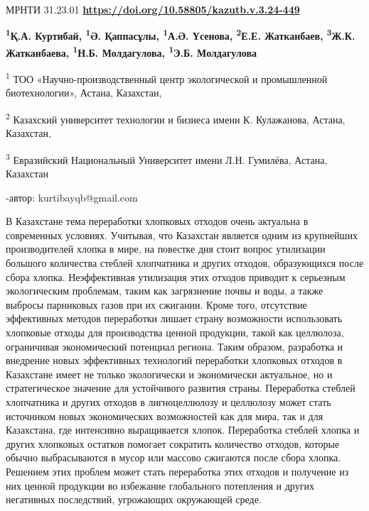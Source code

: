 \newpage
МРНТИ 31.23.01
\hfill {\bfseries \href{https://doi.org/10.58805/kazutb.v.3.24-449}{https://doi.org/10.58805/kazutb.v.3.24-449}}


\begin{center}
{\bfseries \textsuperscript{1}Қ.А. Куртибай\envelope, \textsuperscript{1}Ә. Қаппасұлы, \textsuperscript{1}А.Ә. Үсенова, \textsuperscript{2}Е.Е. Жатканбаев, \textsuperscript{3}Ж.К. Жатканбаева, \textsuperscript{1}Н.Б. Молдагулова, \textsuperscript{1}Э.Б. Молдагулова}

\textsuperscript{1} ТОО «Научно-производственный центр экологической и
промышленной биотехнологии», Астана, Казахстан,

\textsuperscript{2} Казахский университет технологии и бизнеса имени К.
Кулажанова, Астана, Казахстан,

\textsuperscript{3} Евразийский Национальный Университет имени Л.Н.
Гумилёва, Астана, Казахстан

-автор: kurtibayqb@gmail.com
\end{center}

В Казахстане тема переработки хлопковых отходов очень актуальна в
современных условиях. Учитывая, что Казахстан является одним из
крупнейших производителей хлопка в мире, на повестке дня стоит вопрос
утилизации большого количества стеблей хлопчатника и других отходов,
образующихся после сбора хлопка. Неэффективная утилизация этих отходов
приводит к серьезным экологическим проблемам, таким как загрязнение
почвы и воды, а также выбросы парниковых газов при их сжигании. Кроме
того, отсутствие эффективных методов переработки лишает страну
возможности использовать хлопковые отходы для производства ценной
продукции, такой как целлюлоза, ограничивая экономический потенциал
региона. Таким образом, разработка и внедрение новых эффективных
технологий переработки хлопковых отходов в Казахстане имеет не только
экологически и экономически актуальное, но и стратегическое значение для
устойчивого развития страны. Переработка стеблей хлопчатника и других
отходов в лигноцеллюлозу и целлюлозу может стать источником новых
экономических возможностей как для мира, так и для Казахстана, где
интенсивно выращивается хлопок. Переработка стеблей хлопка и других
хлопковых остатков помогает сократить количество отходов, которые обычно
выбрасываются в мусор или массово сжигаются после сбора хлопка. Решением
этих проблем может стать переработка этих отходов и получение из них
ценной продукции во избежание глобального потепления и других негативных
последствий, угрожающих окружающей среде.

